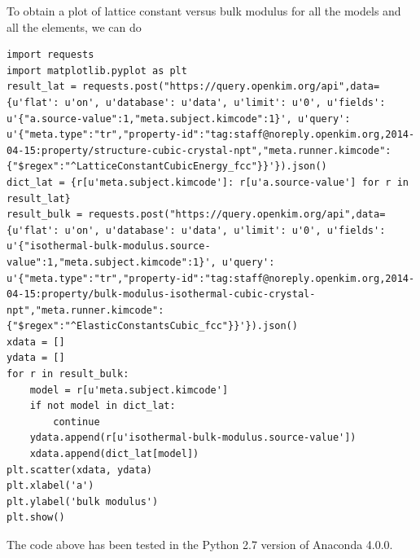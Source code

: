\documentclass[%
 reprint,
 amsmath,amssymb,
 aps,
]{revtex4-1}
\begin{document}
To obtain a plot of lattice constant versus bulk modulus for all the models and all the elements, we can do
\begin{lstlisting}
import requests
import matplotlib.pyplot as plt
result_lat = requests.post("https://query.openkim.org/api",data={u'flat': u'on', u'database': u'data', u'limit': u'0', u'fields': u'{"a.source-value":1,"meta.subject.kimcode":1}', u'query': u'{"meta.type":"tr","property-id":"tag:staff@noreply.openkim.org,2014-04-15:property/structure-cubic-crystal-npt","meta.runner.kimcode":{"$regex":"^LatticeConstantCubicEnergy_fcc"}}'}).json()
dict_lat = {r[u'meta.subject.kimcode']: r[u'a.source-value'] for r in result_lat}
result_bulk = requests.post("https://query.openkim.org/api",data={u'flat': u'on', u'database': u'data', u'limit': u'0', u'fields': u'{"isothermal-bulk-modulus.source-value":1,"meta.subject.kimcode":1}', u'query': u'{"meta.type":"tr","property-id":"tag:staff@noreply.openkim.org,2014-04-15:property/bulk-modulus-isothermal-cubic-crystal-npt","meta.runner.kimcode":{"$regex":"^ElasticConstantsCubic_fcc"}}'}).json()
xdata = []
ydata = []
for r in result_bulk:
    model = r[u'meta.subject.kimcode']
    if not model in dict_lat:
        continue
    ydata.append(r[u'isothermal-bulk-modulus.source-value'])
    xdata.append(dict_lat[model])
plt.scatter(xdata, ydata)
plt.xlabel('a')
plt.ylabel('bulk modulus')
plt.show()
\end{lstlisting}
The code above has been tested in the Python 2.7 version of Anaconda 4.0.0.






\nocite{*}

\end{document}
